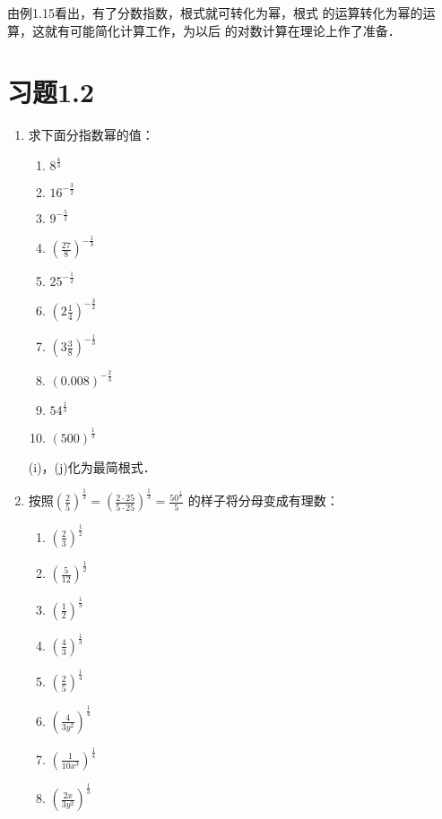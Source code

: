 由例1.15看出，有了分数指数，根式就可转化为幂，根式
的运算转化为幂的运算，这就有可能简化计算工作，为以后
的对数计算在理论上作了准备．

\section*{习题1.2}

\begin{enumerate}
    \item 求下面分指数幂的值：
\begin{multicols}{3}
\begin{enumerate}
    \item $8^{\tfrac{4}{3}}$
    \item $16^{-\tfrac{3}{2}}$
    \item $9^{-\tfrac{5}{2}}$
    \item $\left(\frac{27}{8}\right)^{-\tfrac{1}{3}}$
    \item $25^{-\tfrac{1}{2}}$
    \item $\left(2\frac{1}{4}\right)^{-\tfrac{3}{2}}$
    \item $\left(3\frac{3}{8}\right)^{-\tfrac{1}{3}}$
    \item $(0.008)^{-\tfrac{2}{3}}$
    \item $54^{\tfrac{1}{3}}$
    \item $(500)^{\tfrac{1}{3}}$
\end{enumerate}
\end{multicols}
(i)，(j)化为最简根式．

\item 按照$\left(\frac{2}{5}\right)^{\tfrac{1}{3}}=\left(\frac{2\cdot 25}{5\cdot 25}\right)^{\tfrac{1}{3}}=\frac{50^{\tfrac{1}{3}}}{5} $ 的样子将分母变成有理数：
\begin{multicols}{3}
\begin{enumerate}
    \item $\left(\frac{2}{3}\right)^{\tfrac{1}{2}}$
    \item $\left(\frac{5}{12}\right)^{\tfrac{1}{2}}$
    \item $\left(\frac{1}{2}\right)^{\tfrac{1}{3}}$
    \item $\left(\frac{4}{3}\right)^{\tfrac{1}{3}}$
    \item $\left(\frac{2}{5}\right)^{\tfrac{1}{4}}$
    \item $\left(\frac{4}{3y^2}\right)^{\tfrac{1}{4}}$
    \item $\left(\frac{1}{10x^3}\right)^{\tfrac{1}{4}}$
    \item $\left(\frac{2x}{3y^2}\right)^{\tfrac{1}{3}}$
\end{enumerate}
\end{multicols}


\end{enumerate}
